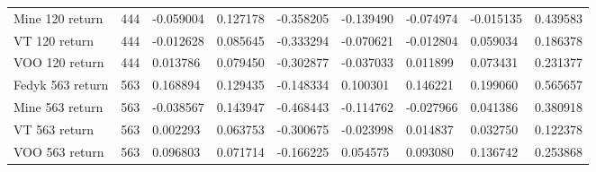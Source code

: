 \begin{appendices}
\begin{table}[ht]
\begin{adjustbox}{width=\textwidth}
\begin{tabular}{@{}lllllllll@{}}
    Mine 120 return      & 444                                & -0.059004                         & 0.127178                         & -0.358205                        & -0.139490                         & -0.074974                         & -0.015135                         & 0.439583                         \\
    VT 120 return             & 444                               & -0.012628                          & 0.085645                         & -0.333294                        & -0.070621                         & -0.012804                         & 0.059034                          & 0.186378                         \\
    VOO 120 return            & 444                               & 0.013786                           & 0.079450                         & -0.302877                        & -0.037033                         & 0.011899                          & 0.073431                          & 0.231377                         \\
    Fedyk 563 return     & 563                                & 0.168894                          & 0.129435                         & -0.148334                        & 0.100301                          & 0.146221                          & 0.199060                          & 0.565657                         \\
    Mine 563 return      & 563                                & -0.038567                         & 0.143947                         & -0.468443                        & -0.114762                         & -0.027966                         & 0.041386                          & 0.380918                         \\
    VT 563 return             & 563                               & 0.002293                           & 0.063753                         & -0.300675                        & -0.023998                         & 0.014837                          & 0.032750                          & 0.122378                         \\
    VOO 563 return            & 563                               & 0.096803                           & 0.071714                         & -0.166225                        & 0.054575                          & 0.093080                          & 0.136742                          & 0.253868
    \end{tabular}
\end{adjustbox}
\label{tab:returns_stocks}
\end{table}


\end{appendices}

